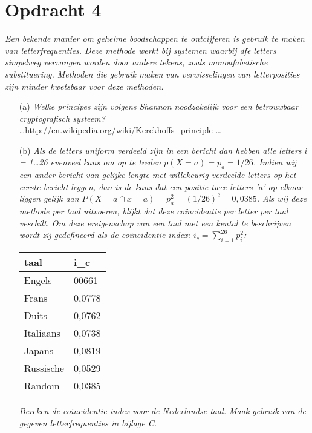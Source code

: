 \section{Opdracht 4}
\emph{Een bekende manier om geheime boodschappen te ontcijferen is gebruik te maken van letterfrequenties. Deze methode werkt bij systemen waarbij dfe letters simpelweg vervangen worden door andere tekens, zoals monoafabetische substituering. Methoden die gebruik maken van verwisselingen van letterposities zijn minder kwetsbaar voor deze methoden.}

\begin{itemize}
\item[(a)] \emph{Welke principes zijn volgens Shannon noodzakelijk voor een betrouwbaar cryptografisch systeem?}\\
  \ldots  http://en.wikipedia.org/wiki/Kerckhoffs\_principle \ldots
  
\item[(b)] \emph{Als de letters uniform verdeeld zijn in een bericht dan hebben alle letters $i$ = 1\ldots26 evenveel kans om op te treden $p(X=a)=p_a=1/26$. Indien wij een ander bericht van gelijke lengte met willekeurig verdeelde letters op het eerste bericht leggen, dan is de kans dat een positie twee letters 'a' op elkaar liggen gelijk aan $P(X=a\cap x = a)=p_a^2=(1/26)^2=0,0385$. Als wij deze methode per taal uitvoeren, blijkt dat deze co\"{i}ncidentie per letter per taal veschilt. Om deze ereigenschap van een taal met een kental te beschrijven wordt zij gedefineerd als de \emph{co\"{i}ncidentie-index}: $i_c=\sum ^{26}_{i=1} p^2_i$:}

\begin{center}
\begin{tabular}{ll}
  taal & i_c \\
  \hline
  Engels & 00661 \\ 
  Frans & 0,0778 \\
  Duits & 0,0762 \\
  Italiaans & 0,0738 \\
  Japans & 0,0819 \\
  Russische & 0,0529 \\
  Random & 0,0385 \\
\end{tabular}
\end{center}

\emph{Bereken de co\"{i}ncidentie-index voor de Nederlandse taal. Maak gebruik van de gegeven letterfrequenties in bijlage C.}


\end{itemize}
